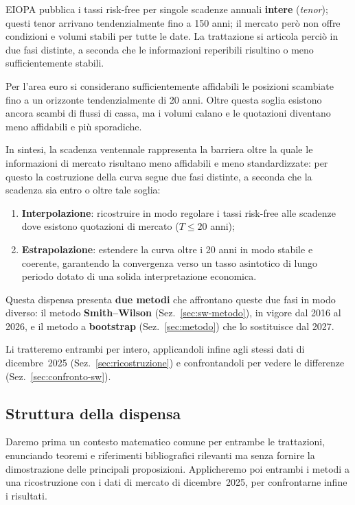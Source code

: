 \documentclass[11pt,a4paper]{article}
\theoremstyle{plain}
\theoremstyle{definition}
\theoremstyle{remark}
\begin{document}
EIOPA pubblica i tassi risk-free per singole scadenze annuali \textbf{intere} (\emph{tenor}); questi
tenor arrivano tendenzialmente fino a 150 anni;
il mercato per\`o non offre condizioni e volumi stabili per tutte le date. La trattazione si articola perci\`o in due fasi distinte, a seconda che
le informazioni reperibili risultino o meno sufficientemente stabili.

Per l'area euro si considerano sufficientemente affidabili le posizioni scambiate fino a un
orizzonte tendenzialmente di 20 anni. Oltre questa soglia esistono ancora
scambi di flussi di cassa, ma i volumi calano e le quotazioni diventano meno affidabili e
più sporadiche.

In sintesi, la scadenza ventennale rappresenta la barriera oltre la quale le informazioni di mercato risultano
meno affidabili e meno standardizzate: per questo la costruzione della curva segue due fasi
distinte, a seconda che la scadenza sia entro o oltre tale soglia:
\begin{enumerate}
  \item \textbf{Interpolazione}: ricostruire in modo regolare i tassi risk-free alle scadenze dove
        esistono quotazioni di mercato ($T \le 20$ anni);
  \item \textbf{Estrapolazione}: estendere la curva oltre i 20 anni in modo stabile e
        coerente, garantendo la convergenza verso un tasso asintotico di lungo periodo dotato di una solida interpretazione economica.
\end{enumerate}



Questa dispensa presenta \textbf{due metodi} che affrontano queste due fasi in modo diverso: il
metodo \textbf{Smith--Wilson} (Sez.~\ref{sec:sw-metodo}), in vigore dal 2016 al 2026, e il
metodo a \textbf{bootstrap} (Sez.~\ref{sec:metodo}) che lo sostituisce dal 2027.

Li tratteremo entrambi per intero, applicandoli infine
agli stessi dati di dicembre~2025 (Sez.~\ref{sec:ricostruzione}) e confrontandoli per vedere le differenze (Sez.~\ref{sec:confronto-sw}).

\subsection{Struttura della dispensa}

Daremo prima un contesto matematico comune per entrambe le trattazioni, enunciando teoremi e
riferimenti bibliografici rilevanti ma senza fornire la dimostrazione delle principali
proposizioni. Applicheremo poi entrambi i metodi a una ricostruzione con i dati di mercato di
dicembre~2025, per confrontarne infine i risultati.
\end{document}
